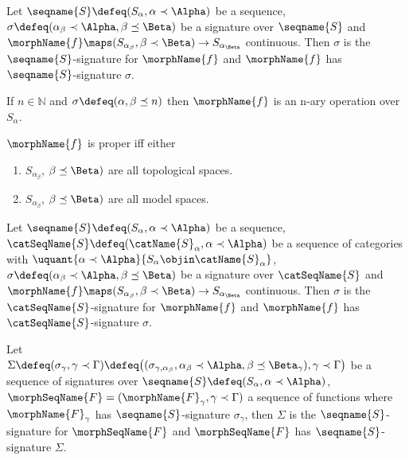 \documentclass{article}
\begin{document}
\begin{definition}
Let $\seqname{S} \defeq (S_\alpha, \alpha \prec \Alpha)$ be a
sequence,
$\sigma \defeq (\alpha_\beta \prec \Alpha, \beta \preceq \Beta)$ be a
signature over $\seqname{S}$ and
$\morphName{f} \maps (S_{\alpha_\beta}, \beta \prec \Beta) \to
S_{\alpha_\Beta}$ continuous.
Then $\sigma$ is the $\seqname{S}$-signature for $\morphName{f}$ and
$\morphName{f}$ has $\seqname{S}$-signature $\sigma$.

\begin{remark}
If $n \in \mathbb{N}$ and $\sigma \defeq (\alpha, \beta \preceq n)$
then $\morphName{f}$ is an n-ary operation over $S_\alpha$.
\end{remark}
$\morphName{f}$ is proper iff either
\begin{enumerate}
\item
$S_{\alpha_\beta}$, $\beta \preceq \Beta)$ are all topological spaces.
\item $S_{\alpha_\beta}$, $\beta \preceq \Beta)$ are all model spaces.
\end{enumerate}
\end{definition}

\begin{definition}
Let $\seqname{S} \defeq (S_\alpha, \alpha \prec \Alpha)$ be a
sequence,
$\catSeqName{S} \defeq (\catName{S}_\alpha, \alpha \prec \Alpha)$ be a
sequence of categories with
$
  \uquant%
    {\alpha \prec \Alpha}
    {S_\alpha \objin \catName{S}_\alpha}
$,
$\sigma \defeq (\alpha_\beta \prec \Alpha, \beta \preceq \Beta)$ be a
signature over $\catSeqName{S}$ and
$\morphName{f} \maps (S_{\alpha_\beta}, \beta \prec \Beta) \to
S_{\alpha_\Beta}$ continuous.
Then $\sigma$ is the $\catSeqName{S}$-signature for $\morphName{f}$ and
$\morphName{f}$ has $\catSeqName{S}$-signature $\sigma$.
\end{definition}

\begin{definition}
Let \\
$\Sigma \defeq (\sigma_\gamma, \gamma \prec \Gamma) \defeq
\bigl ( (\sigma_{\gamma,{\alpha_\beta}}, \alpha_\beta \prec \Alpha,
\beta \preceq \Beta_\gamma), \gamma \prec \Gamma \bigr )$
be a sequence of signatures over
$\seqname{S} \defeq (S_\alpha, \alpha \prec \Alpha)$,
$\morphSeqName{F}=(\morphName{F}_\gamma, \gamma \prec \Gamma)$ a
sequence of functions where $\morphName{F}_\gamma$ has
$\seqname{S}$-signature $\sigma_\gamma$, then $\Sigma$ is the
$\seqname{S}$-signature for $\morphSeqName{F}$ and
$\morphSeqName{F}$ has $\seqname{S}$-signature $\Sigma$.
\end{definition}
\end{document}
